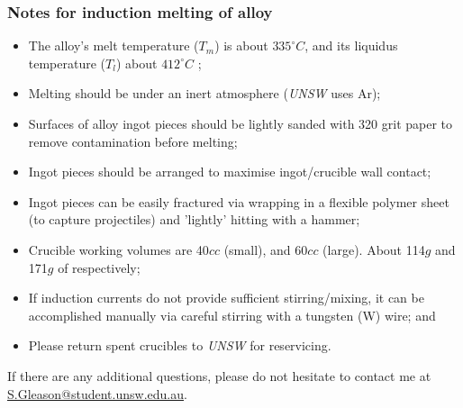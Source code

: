 \subsubsection{Notes for induction melting of \MgZnCa alloy}
\begin{itemize}
\item The \MgZnCa alloy's melt temperature ($T_{m}$) is about $335^{\circ}C$, and its liquidus temperature ($T_{l}$) about $412^{\circ}C$ \cite{Cao_2012} \cite{Gu_2005};
\item Melting should be under an inert atmosphere (\textit{UNSW} uses Ar);
\item Surfaces of alloy ingot pieces should be lightly sanded with 320 grit paper to remove contamination before melting;
\item Ingot pieces should be arranged to maximise ingot/crucible wall contact;
\item Ingot pieces can be easily fractured via wrapping in a flexible polymer sheet (to capture projectiles) and 'lightly' hitting with a hammer;
\item Crucible working volumes are 40$cc$ (small), and 60$cc$ (large). About 114$g$ and 171$g$ of \MgZnCa respectively;
\item If induction currents do not provide sufficient stirring/mixing, it can be accomplished manually via careful stirring with a tungsten (W) wire; and
\item Please return spent crucibles to \textit{UNSW} for reservicing. 
\end{itemize}

If there are any additional questions, please do not hesitate to contact me at \href{"mailto:s.gleason@student.unsw.edu.au"}{S.Gleason@student.unsw.edu.au}. 